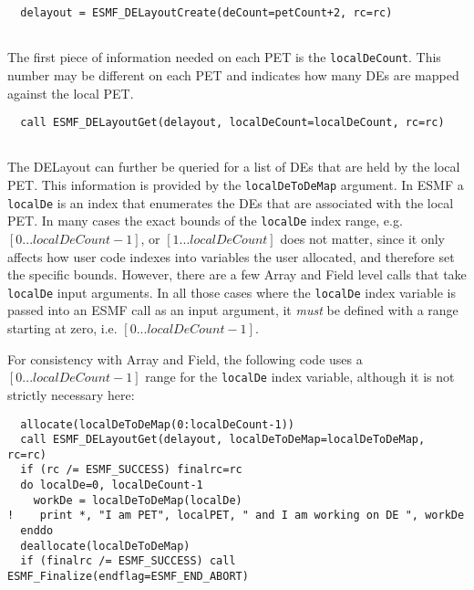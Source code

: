  \begin{verbatim}
  delayout = ESMF_DELayoutCreate(deCount=petCount+2, rc=rc)
 
\end{verbatim}
 

   The first piece of information needed on each PET is the {\tt localDeCount}.
   This number may be different on each PET and indicates how many DEs are 
   mapped against the local PET. 

 \begin{verbatim}
  call ESMF_DELayoutGet(delayout, localDeCount=localDeCount, rc=rc)
 
\end{verbatim}
 

   The DELayout can further be queried for a list of DEs that are held by
   the local PET. This information is provided by the {\tt localDeToDeMap}
   argument. In ESMF a {\tt localDe} is an index that enumerates the DEs that
   are associated with the local PET. In many cases the exact bounds of the
   {\tt localDe} index range, e.g. $[0...localDeCount-1]$, or $[1...localDeCount]$ 
   does not matter, since it only affects how user code indexes into variables
   the user allocated, and therefore set the specific bounds. However, there are 
   a few Array and Field level calls that take {\tt localDe} input arguments. In 
   all those cases where the {\tt localDe} index variable is passed into an ESMF
   call as an input argument, it {\em must} be defined with a range starting at
   zero, i.e. $[0...localDeCount-1]$.
  
   For consistency with Array and Field, the following code uses a 
   $[0...localDeCount-1]$ range for the {\tt localDe} index variable, 
   although it is not strictly necessary here: 

 \begin{verbatim}
  allocate(localDeToDeMap(0:localDeCount-1))
  call ESMF_DELayoutGet(delayout, localDeToDeMap=localDeToDeMap, rc=rc)
  if (rc /= ESMF_SUCCESS) finalrc=rc
  do localDe=0, localDeCount-1
    workDe = localDeToDeMap(localDe)
!    print *, "I am PET", localPET, " and I am working on DE ", workDe
  enddo
  deallocate(localDeToDeMap)
  if (finalrc /= ESMF_SUCCESS) call ESMF_Finalize(endflag=ESMF_END_ABORT)
 
\end{verbatim}
 
